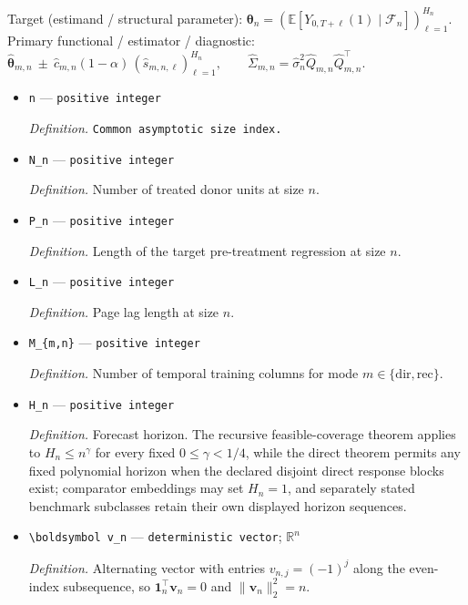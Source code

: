 \documentclass{article}
\begin{document}
Target (estimand / structural parameter): \(\boldsymbol\theta_n=(\mathbb E[Y_{0,T+\ell}(1)\mid\mathcal F_n])_{\ell=1}^{H_n}\).
Primary functional / estimator / diagnostic: \(\widehat{\boldsymbol\theta}_{m,n}\ \pm\ \widehat c_{m,n}(1-\alpha)\,(\widehat s_{m,n,\ell})_{\ell=1}^{H_n},\qquad \widehat\Sigma_{m,n}=\widehat\sigma_n^2\widehat Q_{m,n}\widehat Q_{m,n}^{\top}\).
\begin{itemize}
  \item \texttt{n} --- \texttt{positive integer}
  \par\smallskip\noindent\emph{Definition.} \texttt{Common asymptotic size index.}
  \item \texttt{N\_\allowbreak{}n} --- \texttt{positive integer}
  \par\smallskip\noindent\emph{Definition.} Number of treated donor units at size \(n\).
  \item \texttt{P\_\allowbreak{}n} --- \texttt{positive integer}
  \par\smallskip\noindent\emph{Definition.} Length of the target pre-treatment regression at size \(n\).
  \item \texttt{L\_\allowbreak{}n} --- \texttt{positive integer}
  \par\smallskip\noindent\emph{Definition.} Page lag length at size \(n\).
  \item \texttt{M\_\allowbreak{}\{m,\allowbreak{}n\}\allowbreak{}} --- \texttt{positive integer}
  \par\smallskip\noindent\emph{Definition.} Number of temporal training columns for mode \(m\in\{\mathrm{dir},\mathrm{rec}\}\).
  \item \texttt{H\_\allowbreak{}n} --- \texttt{positive integer}
  \par\smallskip\noindent\emph{Definition.} Forecast horizon. The recursive feasible-coverage theorem applies to \(H_n\le n^\gamma\) for every fixed \(0\le\gamma<1/4\), while the direct theorem permits any fixed polynomial horizon when the declared disjoint direct response blocks exist; comparator embeddings may set \(H_n=1\), and separately stated benchmark subclasses retain their own displayed horizon sequences.
  \item \texttt{\textbackslash{}\allowbreak{}boldsymbol v\_\allowbreak{}n} --- \texttt{deterministic vector}; \(\mathbb R^n\)
  \par\smallskip\noindent\emph{Definition.} Alternating vector with entries \(v_{n,j}=(-1)^j\) along the even-index subsequence, so \(\boldsymbol 1_n^{\top}\boldsymbol v_n=0\) and \(\|\boldsymbol v_n\|_2^2=n\).

\end{itemize}
\end{document}
